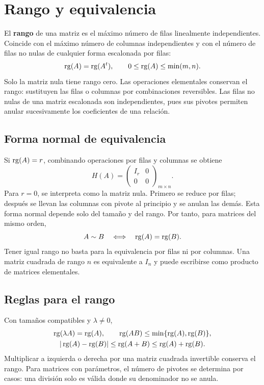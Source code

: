 

\section{Rango y equivalencia}
\label{sec:rango}

El \textbf{rango} de una matriz es el máximo número de filas linealmente
independientes. Coincide con el máximo número de columnas independientes
y con el número de filas no nulas de cualquier forma escalonada por filas:
\[
 \operatorname{rg}(A)=\operatorname{rg}(A^t),\qquad 0\le\operatorname{rg}(A)\le\min(m,n).
\]
Solo la matriz nula tiene rango cero. Las operaciones elementales conservan
el rango: sustituyen las filas o columnas por combinaciones reversibles.
Las filas no nulas de una matriz escalonada son independientes, pues sus
pivotes permiten anular sucesivamente los coeficientes de una relación.

\subsection*{Forma normal de equivalencia}

Si $\operatorname{rg}(A)=r$, combinando operaciones por filas y columnas se obtiene
\[
 H(A)=\begin{pmatrix}I_r&0\\0&0\end{pmatrix}_{m\times n}.
\]
Para $r=0$, se interpreta como la matriz nula. Primero se reduce por filas;
después se llevan las columnas con pivote al principio y se anulan las demás.
Esta forma normal depende solo del tamaño y del rango. Por tanto, para
matrices del mismo orden,
\[
 A\sim B\quad\Longleftrightarrow\quad\operatorname{rg}(A)=\operatorname{rg}(B).
\]
Tener igual rango no basta para la equivalencia por filas ni por columnas.
Una matriz cuadrada de rango $n$ es equivalente a $I_n$ y puede escribirse
como producto de matrices elementales.

\subsection*{Reglas para el rango}

Con tamaños compatibles y $\lambda\ne0$,
\[
 \begin{gathered}
 \operatorname{rg}(\lambda A)=\operatorname{rg}(A),\qquad
 \operatorname{rg}(AB)\le\min\{\operatorname{rg}(A),\operatorname{rg}(B)\},\\
 |\operatorname{rg}(A)-\operatorname{rg}(B)|\le\operatorname{rg}(A+B)\le\operatorname{rg}(A)+\operatorname{rg}(B).
 \end{gathered}
\]
Multiplicar a izquierda o derecha por una matriz cuadrada invertible
conserva el rango. Para matrices con parámetros, el número de pivotes
se determina por casos: una división solo es válida donde su denominador
no se anula.

